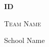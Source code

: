 \documentclass[extrafontsizes,30pt]{memoir}
\begin{document}
\newcommand{\TeamID}{ID}
\newcommand{\TeamName}{Team Name}
\newcommand{\SchoolName}{School Name}
\begin{center}
\mbox{}
\vspace{1in}

{\Huge \textbf{ \TeamID}}

\vspace{1in}

{\Large \textsc{\TeamName}}

\vspace{1in}

{\large \SchoolName}
\end{center}
\newpage
\end{document}
